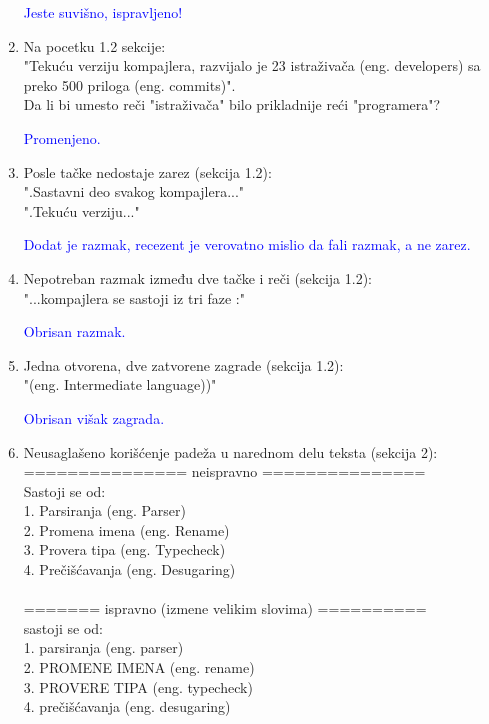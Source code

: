 \documentclass[a4paper]{report}
\newcommand{\odgovor}[1]{\textcolor{blue}{#1}}
\begin{document}
\begin{enumerate}
		\odgovor{Jeste suvišno, ispravljeno!}
		
		\item Na pocetku 1.2 sekcije:\\
		"Tekuću verziju kompajlera, razvijalo je 23 istraživača (eng.
		developers) sa preko 500 priloga (eng. commits)". \\
		Da li bi umesto reči "istraživača" bilo prikladnije reći "programera"?
		
		\odgovor{Promenjeno.}
		
		\item Posle tačke nedostaje zarez (sekcija 1.2):\\
		".Sastavni deo svakog kompajlera..."\\
		".Tekuću verziju..."
		
		\odgovor{Dodat je razmak, recezent je verovatno mislio da fali razmak, a ne zarez.}
		
		\item Nepotreban razmak između dve tačke i reči (sekcija 1.2):\\
		"...kompajlera se sastoji iz tri faze :"
		
		\odgovor{Obrisan razmak.}
		
		\item Jedna otvorena, dve zatvorene zagrade (sekcija 1.2):\\
		"(eng. Intermediate language))"
		
		\odgovor{Obrisan višak zagrada.}
		
		\item Neusaglašeno korišćenje padeža u narednom delu teksta (sekcija 2):\\
		=============== neispravno ===============\\
		Sastoji se od:\\
		1. Parsiranja (eng. Parser)\\
		2. Promena imena (eng. Rename)\\
		3. Provera tipa (eng. Typecheck)\\
		4. Prečišćavanja (eng. Desugaring)\\\\
		======= ispravno (izmene velikim slovima) ==========\\
		sastoji se od:\\	
		1. parsiranja (eng. parser)\\	
		2. PROMENE IMENA (eng. rename)\\	
		3. PROVERE TIPA (eng. typecheck)\\
		4. prečišćavanja (eng. desugaring)
		

\end{enumerate}
\end{document}
